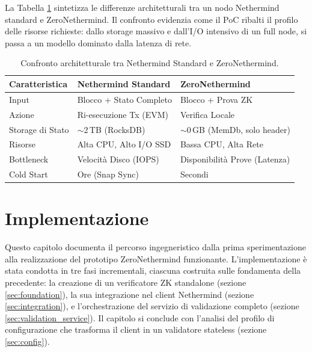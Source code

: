 \documentclass[12pt,a4paper,openright,twoside]{report}
\begin{document}
La Tabella \ref{tab:confronto_nethermind} sintetizza le differenze architetturali tra un nodo Nethermind standard e ZeroNethermind. Il confronto evidenzia come il PoC ribalti il profilo delle risorse richieste: dallo storage massivo e dall'I/O intensivo di un full node, si passa a un modello dominato dalla latenza di rete.\\

\begin{table}[H]
\centering
\begin{tabular}{l l l}
\hline
\textbf{Caratteristica} & \textbf{Nethermind Standard} & \textbf{ZeroNethermind} \\
\hline
Input & Blocco + Stato Completo & Blocco + Prova ZK \\
Azione & Ri-esecuzione Tx (EVM) & Verifica Locale \\
Storage di Stato & $\sim$2\,TB (RocksDB) & $\sim$0\,GB (MemDb, solo header) \\
Risorse & Alta CPU, Alto I/O SSD & Bassa CPU, Alta Rete \\
Bottleneck & Velocità Disco (IOPS) & Disponibilità Prove (Latenza) \\
Cold Start & Ore (Snap Sync) & Secondi \\
\hline
\end{tabular}
\caption{Confronto architetturale tra Nethermind Standard e ZeroNethermind.}
\label{tab:confronto_nethermind}
\end{table}


\chapter{Implementazione}\label{chap:implementazione}

Questo capitolo documenta il percorso ingegneristico dalla prima sperimentazione alla realizzazione del prototipo ZeroNethermind funzionante. L'implementazione è stata condotta in tre fasi incrementali, ciascuna costruita sulle fondamenta della precedente: la creazione di un verificatore ZK standalone (sezione \ref{sec:foundation}), la sua integrazione nel client Nethermind (sezione \ref{sec:integration}), e l'orchestrazione del servizio di validazione completo (sezione \ref{sec:validation_service}). Il capitolo si conclude con l'analisi del profilo di configurazione che trasforma il client in un validatore stateless (sezione \ref{sec:config}).
\end{document}
